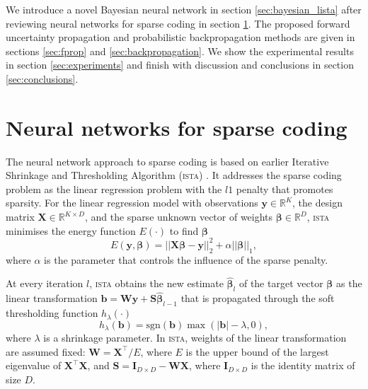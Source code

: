 \documentclass{article}
\begin{document}
  We introduce a novel Bayesian neural network in section \ref{sec:bayesian_lista} after reviewing neural networks for sparse coding in section \ref{sec:nn_sc}. The proposed forward uncertainty propagation and probabilistic backpropagation methods are given in sections \ref{sec:fprop} and \ref{sec:backpropagation}. We show the experimental results in section \ref{sec:experiments} and finish with discussion and conclusions in section \ref{sec:conclusions}.

\section{Neural networks for sparse coding}
\label{sec:nn_sc}
  The neural network approach to sparse coding is based on earlier Iterative Shrinkage and Thresholding Algorithm (\textsc{ista}) \cite{daubechies2004iterative}. It addresses the sparse coding problem as the linear regression problem with the $l1$ penalty that promotes sparsity. For the linear regression model with observations $\mathbf{y} \in \mathbb{R}^K$, the design matrix $\mathbf{X} \in \mathbb{R}^{K \times D}$, and the sparse unknown vector of weights $\boldsymbol\beta \in \mathbb{R}^D$, \textsc{ista} minimises the energy function $E(\cdot)$ to find $\boldsymbol\beta$
  \begin{equation}
  \label{eq:regression_problem}
  E(\mathbf{y}, \boldsymbol\beta) = ||\mathbf{X}\boldsymbol\beta - \mathbf{y}||_2^2 + \alpha ||\boldsymbol\beta||_1,
  \end{equation}
  where $\alpha$ is the parameter that controls the influence of the sparse penalty.
  
  At every iteration $l$, \textsc{ista} obtains the new estimate $\widehat{\boldsymbol\beta}_l$ of the target vector $\boldsymbol\beta$ as the linear transformation $\mathbf{b} = \mathbf{W}\mathbf{y} + \mathbf{S}\widehat{\boldsymbol\beta}_{l-1}$ that is propagated through the soft thresholding function $h_\lambda(\cdot)$
  \begin{equation}
  h_\lambda(\mathbf{b}) = \text{sgn}(\mathbf{b}) \max(|\mathbf{b}| - \lambda, 0),
  \end{equation}
  where $\lambda$ is a shrinkage parameter.
  In \textsc{ista}, weights of the linear transformation are assumed fixed: $\mathbf{W} = \mathbf{X}^\top / E$, where $E$ is the upper bound of the largest eigenvalue of $\mathbf{X}^\top\mathbf{X}$, and $\mathbf{S} = \mathbf{I}_{D \times D} - \mathbf{W}\mathbf{X}$, where $\mathbf{I}_{D \times D}$ is the identity matrix of size $D$.
  
\end{document}
